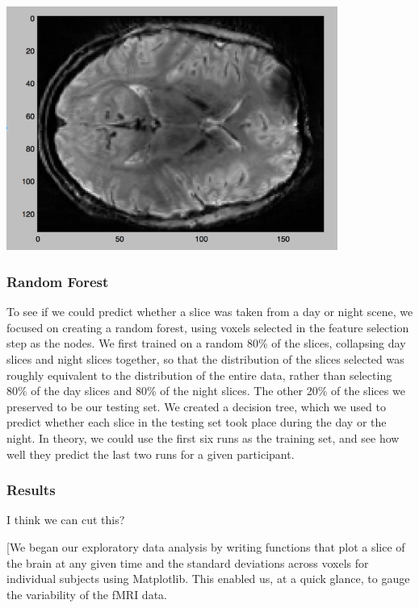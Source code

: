 \documentclass[11pt]{article}
\begin{document}
\begin{center}
\includegraphics[height=8cm]{7}
\end{center}

\subsubsection{Random Forest}

To see if we could predict whether a slice was taken from a day or night
scene, we focused on creating a random forest, using voxels selected in the 
feature selection step as the nodes.  We first trained on a random 80\% of the 
slices, collapsing day slices and night slices together, so that the distribution of
the slices selected was roughly equivalent to the distribution of the entire
data, rather than selecting 80\% of the day slices and 80\% of the night
slices.  The other 20\% of the slices we preserved to be our testing set.  We
created a decision tree, which we used to predict whether each slice in the
testing set took place during the day or the night.  In theory, we could use
the first six runs as the training set, and see how well they predict the last
two runs for a given participant.

\subsubsection{Results}

I think we can cut this?

[We began our exploratory data analysis by writing functions
that plot a slice of the brain at any given time and the standard deviations
across voxels for individual subjects using Matplotlib. This enabled us, at a
quick glance, to gauge the variability of the fMRI data.
\end{document}
